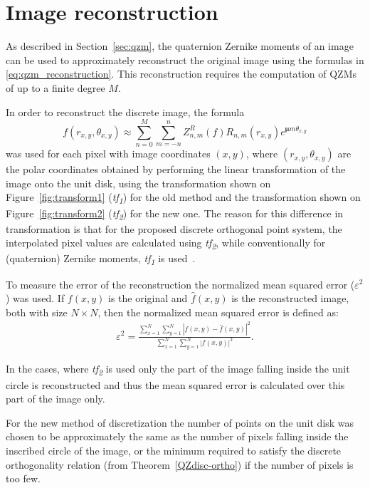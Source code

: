 \section{Image reconstruction}\label{sec:reconstruction}
As described in Section~\ref{sec:qzm}, the quaternion Zernike moments of an image can be used to approximately reconstruct the original image using the formulas in \eqref{eq:qzm_reconstruction}. This reconstruction requires the computation of QZMs of up to a finite degree $M$.

In order to reconstruct the discrete image, the formula 
$$
f(r_{x,y},\theta_{x,y}) \approx \sum_{n=0}^{M}\sum_{m=-n}^{n}Z_{n,m}^R(f)R_{n,m}(r_{x,y})e^{\bm{\mu}m\theta_{x,y}}
$$
was used for each pixel with image coordinates $(x,y)$, where $(r_{x,y},\theta_{x,y})$ are the polar coordinates obtained by performing the linear transformation of the image onto the unit disk, using the transformation shown on Figure~\ref{fig:transform1} (\textit{tf\textsubscript{1}}) for the old method and the transformation shown on Figure~\ref{fig:transform2} (\textit{tf\textsubscript{2}}) for the new one. The reason for this difference in transformation is that for the proposed discrete orthogonal point system, the interpolated pixel values are calculated using \textit{tf\textsubscript{2}}, while conventionally for (quaternion) Zernike moments, \textit{tf\textsubscript{1}} is used~\cite{qzmi}.

To measure the error of the reconstruction the normalized mean squared error ($\varepsilon^2$) was used. If $f(x,y)$ is the original and $\widehat{f}(x,y)$ is the reconstructed image, both with size $N \times N$, then the normalized mean squared error is defined as:
\begin{gather} \label{eq:mean_sq_error}
    \varepsilon^2 = \frac{\displaystyle \sum_{x=1}^N\sum_{y=1}^N \left|f(x,y) - \widehat{f}(x,y)\right|^2}{\displaystyle \sum_{x=1}^N\sum_{y=1}^N \left|f(x,y)\right|^2}.
\end{gather}

In the cases, where \textit{tf\textsubscript{2}} is used only the part of the image falling inside the unit circle is reconstructed and thus the mean squared error is calculated over this part of the image only.

For the new method of discretization the number of points on the unit disk was chosen to be approximately the same as the number of pixels falling inside the inscribed circle of the image, or the minimum required to satisfy the discrete orthogonality relation (from Theorem~\ref{QZdisc-ortho}) if the number of pixels is too few. 

